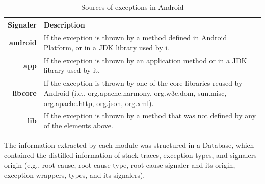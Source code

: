 \documentclass[conference]{IEEEtran}
\begin{document}
\begin{table}
  \centering
  \begin{tabular}{rp{29em}}
    \hline
    \bfseries{Signaler} & \bfseries{Description} \\
    \hline
    \bfseries{android} & If the exception is thrown by a method defined in Android Platform, or in a JDK library used by i.\\
    \bfseries{app}     & If the exception is thrown by an application method or in a JDK library used by it.\\
    \bfseries{libcore} & If the exception is thrown by one of the core libraries reused by Android (i.e., org.apache.harmony, org.w3c.dom, sun.misc, org.apache.http, org.json, org.xml). \\
    \bfseries{lib}     & If the exception is thrown by a method that was not defined by any of the elements above.\\
    \hline
  \end{tabular}
  \caption{Sources of exceptions in Android}
  \label{tab:signalers}
\end{table}

The information extracted by each module was structured in a Database,
which contained the distilled information of stack traces, exception types,
and signalers origin (e.g., root cause, root cause type, root cause signaler and its origin,
exception wrappers,  types, and its signalers).


\end{document}
